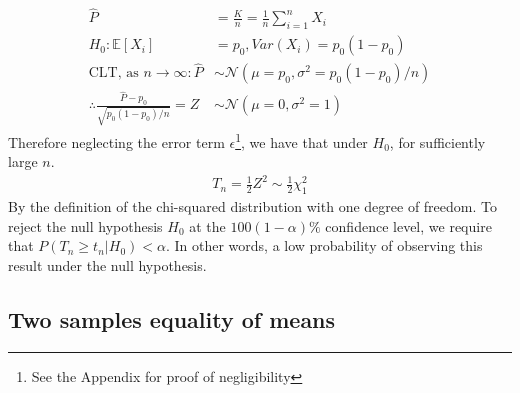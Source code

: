 \documentclass[]{article}
\newcommand{\E}{\mathbb{E}}
\newcommand{\Gaussian}{\mathcal{N}}
\begin{document}
%
\begin{align*}
\hat{P} &= \frac{K}{n} = \frac{1}{n} \sum_{i=1}^{n} X_i \\
H_0: \E[X_i] &= p_0, Var(X_i) = p_0(1-p_0) \\
\text{CLT, as }n \rightarrow \infty: \hat{P} &\sim \Gaussian\left(\mu=p_0, \sigma^2=p_0(1-p_0)/n\right) \\
\therefore \frac{\hat{P}-p_0}{\sqrt{p_0(1-p_0)/n}} = Z &\sim \Gaussian(\mu=0,\sigma^2=1)
\end{align*}
%
Therefore neglecting the error term $\epsilon$\footnote{See the Appendix for proof of negligibility}, we have that under $H_0$, for sufficiently large $n$.
%
\begin{align}
T_n = \frac{1}{2} Z^2 \sim \frac{1}{2} \chi_1^2
\end{align}
%
By the definition of the chi-squared distribution with one degree of freedom. To reject the null hypothesis $H_0$ at the $100(1-\alpha)\%$ confidence level, we require that $P(T_n \geq t_n | H_0) < \alpha$. In other words, a low probability of observing this result under the null hypothesis.

\subsection{Two samples equality of means}
\end{document}
